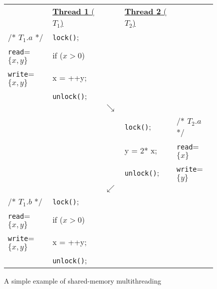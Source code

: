 \begin{figure}[t]
\centering
\myfontsize
{
\begin{tabular}
{m{1.5cm} m{1.4cm} m{0.1cm} m{1.8cm} m{1.2cm}}
&\underline{{\bf Thread 1} ($T_1$)} & & \underline{ {\bf Thread 2}  ($T_2$)} &\\


/* \underline{$T_{1}.a$} */ & {\tt lock()}; && &\\

 {\tt read}=$\{x, y\}$  &if ($x > 0$) && &\\
 {\tt write}=$\{x, y\}$ &  x = ++y;&& &\\
 & {\tt unlock()};&& &\\
        &  &  $\searrow$ & & \\


&&  & {\tt lock()}; &  /* \underline{$T_{2}.a$ }*/\\
&&  & y = 2* x;    & {\tt read}=$\{x\}$  \\
&  &  & {\tt unlock()}; &  {\tt write}=$\{y\}$ \\

        &  &  $\swarrow$ & & \\
/* \underline{$T_{1}.b$} */ & {\tt lock()}; && &\\

 {\tt read}=$\{x, y\}$  &if ($x > 0$) && &\\
 {\tt write}=$\{x, y\}$ &  x = ++y;&& &\\
 & {\tt unlock()};&& &\\

\end{tabular}
}


\caption{ A simple example of shared-memory multithreading}
\label{fig:simple-example}
\end{figure}
